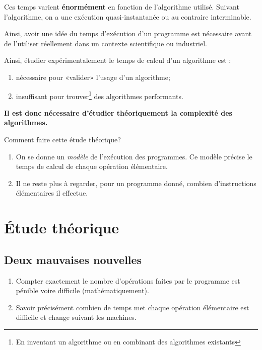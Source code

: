 Ces temps varient \textbf{énormément} en fonction de l'algorithme utilisé.
Suivant l'algorithme, on a une exécution quasi-instantanée ou au contraire interminable.

Ainsi, avoir une idée du temps d'exécution d'un programme est nécessaire avant
de l'utiliser réellement dans un contexte scientifique ou industriel.

Ainsi, étudier expérimentalement le temps de calcul d'un algorithme est :
\begin{enumerate}
\item nécessaire pour «valider» l'usage d'un algorithme;
\item insuffisant pour trouver\footnote{En inventant un
    algorithme ou en combinant des algorithmes existants} des algorithmes performants.
\end{enumerate}

\begin{center}
\textbf{Il est donc nécessaire d'étudier théoriquement la complexité
  des algorithmes.}  
\end{center}

Comment faire cette étude théorique?

\begin{enumerate}
\item On se donne un \emph{modèle} de l'exécution des programmes. Ce
  modèle précise le temps de calcul de chaque opération élémentaire.
\item Il ne reste plus à regarder, pour un programme donné, combien
  d'instructions élémentaires il effectue.
\end{enumerate}

\section{Étude théorique}


\subsection{Deux mauvaises nouvelles}

\begin{enumerate}
\item Compter exactement le nombre d'opérations faites par le
  programme est pénible voire difficile (mathématiquement).
\item Savoir précisément combien de temps met chaque opération
  élémentaire est difficile et change suivant les machines.
\end{enumerate}

